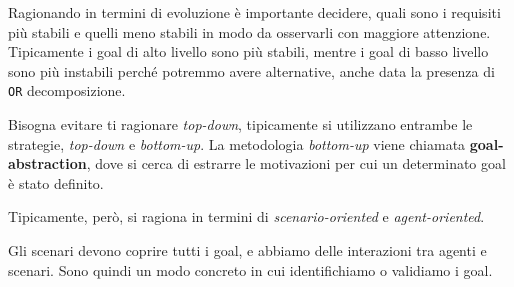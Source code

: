 Ragionando in termini di evoluzione è importante decidere, quali sono i requisiti più stabili 
e quelli meno stabili in modo da osservarli con maggiore attenzione.
Tipicamente i goal di alto livello sono più stabili, mentre i goal di basso livello sono
più instabili perché potremmo avere alternative, anche data la presenza di \texttt{OR} decomposizione.

Bisogna evitare ti ragionare \textit{top-down}, tipicamente si utilizzano entrambe 
le strategie, \textit{top-down} e \textit{bottom-up}. La metodologia \textit{bottom-up}
viene chiamata \textbf{goal-abstraction}, dove si cerca di estrarre le motivazioni per cui un determinato 
goal è stato definito.

Tipicamente, però, si ragiona in termini di \textit{scenario-oriented} e \textit{agent-oriented}.
\begin{figure}[H]
    \centering
\end{figure}
Gli scenari devono coprire tutti i goal, e abbiamo delle interazioni tra agenti e
scenari. Sono quindi un modo concreto in cui identifichiamo o validiamo i goal.